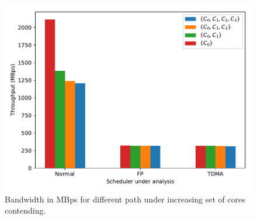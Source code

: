 \begin{figure}
  \centering
  \includegraphics[scale=0.45]{images/bw_comparisons_no_ts.pdf}
  \caption{Bandwidth in MBps for different path under increasing set of cores contending.}
  \label{fig:bandwidth_comparison}
\end{figure}


